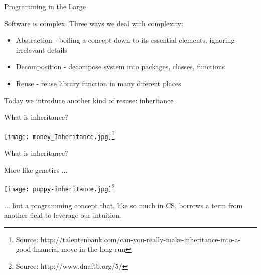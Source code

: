 \documentclass{beamer}
\author[Chris Simpkins]
{Christopher Simpkins \\\texttt{chris.simpkins@gatech.edu}}
\institute[Georgia Tech] %
\date{}
\begin{document}
\begin{frame}
  \titlepage
\end{frame}

\begin{frame}[fragile]{Programming in the Large}


Software is complex.  Three ways we deal with complexity:
\begin{itemize}
\item Abstraction - boiling a concept down to its essential elements, ignoring irrelevant details
\item Decomposition - decompose system into packages, classes, functions
\item Reuse - reuse library function in many diferent places
\end{itemize}
\vspace{.1in}
Today we introduce another kind of resuse: inheritance

\end{frame}

\begin{frame}[fragile]{What is inheritance?}

\begin{center}
\texttt{[image: money\_Inheritance.jpg]}\footnote{Source: http://talentenbank.com/can-you-really-make-inheritance-into-a-good-financial-move-in-the-long-run}
\end{center}

\end{frame}

\begin{frame}[fragile]{What is inheritance?}


More like genetics ...
\begin{center}
\texttt{[image: puppy-inheritance.jpg]}\footnote{Source: http://www.dnaftb.org/5/}\\
\end{center}
... but a programming concept that, like so much in CS, borrows a term from another field to leverage our intuition.

\end{frame}
\end{document}
